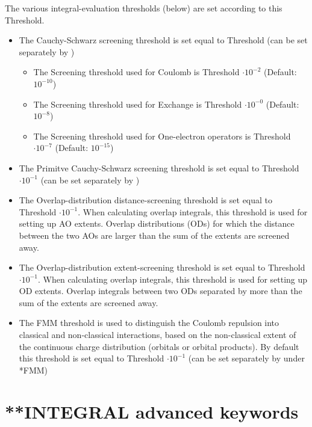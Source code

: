 \begin{description}
The various integral-evaluation thresholds (below) are set according to this Threshold. 
\begin{itemize}
\item The Cauchy-Schwarz screening threshold is set equal to Threshold (can be set separately by )
\begin{itemize}
  \item The Screening threshold used for Coulomb is Threshold $\cdot 10^{-2}$ (Default: $10^{-10}$) 
  \item The Screening threshold used for Exchange is Threshold $\cdot 10^{-0}$ (Default: $10^{-8}$)
  \item The Screening threshold used for One-electron operators is Threshold $\cdot 10^{-7}$ (Default: $10^{-15}$)
\end{itemize}
\item The Primitve Cauchy-Schwarz screening threshold is set equal to Threshold$\cdot 10^{-1}$  (can be set separately by )
\item The Overlap-distribution distance-screening threshold is set equal to 
      Threshold $\cdot 10^{-1}$.
      When calculating overlap integrals, this threshold 
      is used for setting up AO extents. Overlap distributions (ODs) for which the 
      distance between the two AOs are larger than the sum of the extents are 
      screened away. %
\item The Overlap-distribution extent-screening threshold is set equal to 
      Threshold $\cdot 10^{-1}$. When calculating overlap integrals, this threshold 
      is used for setting up OD extents. Overlap integrals between two ODs separated
      by more than the sum of the extents are screened away. %
\item The FMM threshold is used to distinguish the Coulomb repulsion into classical and non-classical interactions, based on
      the non-classical extent of the continuous charge distribution (orbitals or orbital products). By default this threshold 
      is set equal to Threshold $\cdot 10^{-1}$ (can be set separately by  under *FMM)
\end{itemize}
\end{description}

\section{**INTEGRAL advanced keywords}\label{sec:integral:adv}

